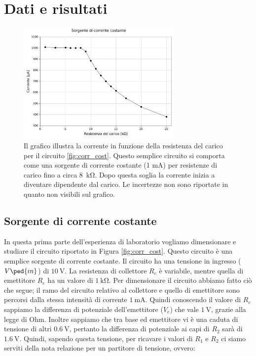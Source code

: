 \section*{Dati e risultati}

\begin{figure}
	\centering
	\includegraphics[width=0.72\textwidth]{current.pdf}
	\caption{Il grafico illustra la corrente in funzione della resistenza del carico per il circuito
	    \ref{fig:corr_cost}. Questo semplice circuito si comporta come una sorgente di corrente costante (1 mA)
	    per resistenze di carico fino a circa \SI{8}{\kilo\ohm}. Dopo questa soglia la corrente inizia a diventare
	    dipendente dal carico. Le incertezze non sono riportate in quanto non visibili sul grafico.}
	\label{fig:curr}
\end{figure}

\subsection*{Sorgente di corrente costante}

In questa prima parte dell'esperienza di laboratorio vogliamo dimensionare e studiare il circuito riportato in Figura \ref{fig:corr_cost}. Questo circuito è una semplice sorgente di corrente costante. Il circuito ha una tensione in ingresso ($V\ped{in}$) di $\SI{10}{\volt}$. La resistenza di collettore $R_c$ è variabile, mentre quella di emettitore $R_e$ ha un valore di $\SI{1}{\kilo\ohm}$.
Per dimensionare il circuito abbiamo fatto ciò che segue; il ramo del circuito relativo al collettore e quello di emettitore sono percorsi dalla stessa intensità di corrente $\SI{1}{\milli\ampere}$. Quindi conoscendo il valore di $R_e$ sappiamo la differenza di potenziale dell'emettitore ($V_e$) che vale $\SI{1}{\volt}$, grazie alla legge di Ohm. Inoltre sappiamo che tra base ed emettitore vi è una caduta di tensione di altri $\SI{0.6}{\volt}$, pertanto la differenza di potenziale ai capi di $R_2$ sarà di $\SI{1.6}{\volt}$.
Quindi, sapendo questa tensione, per ricavare i valori di $R_1$ e $R_2$ ci siamo serviti della nota relazione per un partitore di tensione, ovvero:

